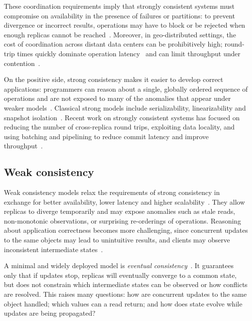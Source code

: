 These coordination requirements imply that strongly consistent systems must
compromise on availability in the presence of failures or partitions: to prevent
divergence or incorrect results, operations may have to block or be rejected when
enough replicas cannot be reached~\cite{bailis2013hatrack,bailis2013eventually}.
Moreover, in geo-distributed settings, the cost of coordination across distant
data centers can be prohibitively high; round-trip times quickly dominate
operation latency~\cite{spanner,bailis2013eventually,tilley2013cloud}
and can limit throughput under contention~\cite{bailis2013hatrack}.

On the positive side, strong consistency makes it easier to develop correct
applications: programmers can reason about a single, globally ordered sequence of
operations and are not exposed to many of the anomalies that appear under weaker
models~\cite{adya1999weak,avoidence}. Classical strong models include
serializability, linearizability and snapshot isolation~\cite{bernstein1987concurrency,linearizability,si}.
Recent work on strongly consistent systems has focused on reducing the number of
cross-replica round trips, exploiting data locality, and using batching and
pipelining to reduce commit latency and improve throughput~\cite{spanner, spanner,mu2014,wolf2016calvin}.

\subsection{Weak consistency}
\label{sec:weak-consistency}

Weak consistency models relax the requirements of strong consistency in exchange
for better availability, lower latency and higher scalability~\cite{bailis2013eventually,session,dynamo,occic2012causal}.
They allow replicas to diverge temporarily and may expose anomalies such as stale
reads, non-monotonic observations, or surprising re-orderings of operations.
Reasoning about application correctness becomes more challenging, since
concurrent updates to the same objects may lead to unintuitive results, and
clients may observe inconsistent intermediate states~\cite{adya1999weak,bailis2013eventually}.

A minimal and widely deployed model is \emph{eventual consistency}~\cite{bailis2013eventually,dynamo}.
It guarantees only that if updates stop, replicas will eventually converge to a
common state, but does not constrain which intermediate states can be observed
or how conflicts are resolved. This raises many questions: how are concurrent
updates to the same object handled; which values can a read return; and how does
state evolve while updates are being propagated?


